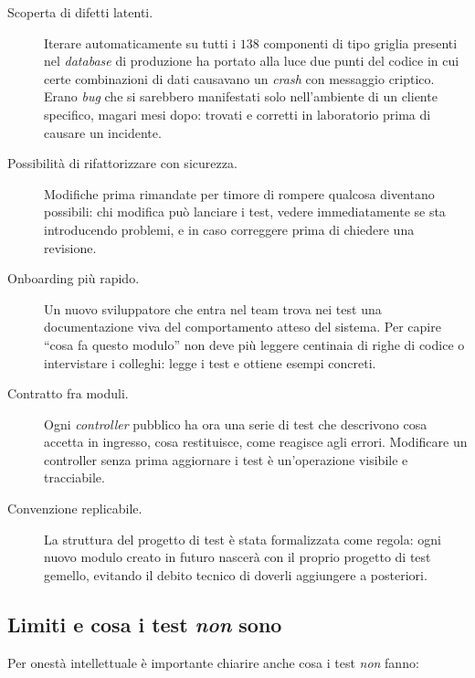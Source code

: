 \begin{description}
    \item[Scoperta di difetti latenti.] Iterare automaticamente su tutti i $138$ componenti di tipo griglia presenti nel \emph{database} di produzione ha portato alla luce due punti del codice in cui certe combinazioni di dati causavano un \emph{crash} con messaggio criptico. Erano \emph{bug} che si sarebbero manifestati solo nell'ambiente di un cliente specifico, magari mesi dopo: trovati e corretti in laboratorio prima di causare un incidente.
    \item[Possibilità di rifattorizzare con sicurezza.] Modifiche prima rimandate per timore di rompere qualcosa diventano possibili: chi modifica può lanciare i test, vedere immediatamente se sta introducendo problemi, e in caso correggere prima di chiedere una revisione.
    \item[Onboarding più rapido.] Un nuovo sviluppatore che entra nel team trova nei test una documentazione viva del comportamento atteso del sistema. Per capire ``cosa fa questo modulo'' non deve più leggere centinaia di righe di codice o intervistare i colleghi: legge i test e ottiene esempi concreti.
    \item[Contratto fra moduli.] Ogni \emph{controller} pubblico ha ora una serie di test che descrivono cosa accetta in ingresso, cosa restituisce, come reagisce agli errori. Modificare un controller senza prima aggiornare i test è un'operazione visibile e tracciabile.
    \item[Convenzione replicabile.] La struttura del progetto di test è stata formalizzata come regola: ogni nuovo modulo creato in futuro nascerà con il proprio progetto di test gemello, evitando il debito tecnico di doverli aggiungere a posteriori.
\end{description}

\subsection{Limiti e cosa i test \emph{non} sono}

Per onestà intellettuale è importante chiarire anche cosa i test \emph{non} fanno:

